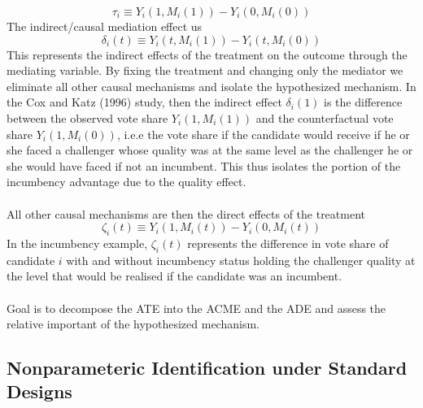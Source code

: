 \documentclass{article}
\begin{document}
	$$
	\tau_i \equiv Y_i(1, M_i(1)) - Y_i(0,M_i(0))
	$$
	The indirect/causal mediation effect us
	$$
	\delta_i(t) \equiv Y_i(t,M_i(1)) - Y_i(t, M_i(0))
	$$
	This represents the indirect effects of the treatment on the outcome through the mediating variable. By fixing the treatment and changing only the mediator we eliminate all other causal mechanisms and isolate the hypothesized mechanism. In the Cox and Katz (1996) study, then the indirect effect $\delta_i(1)$ is the difference between the observed vote share $Y_i(1,M_i(1))$ and the counterfactual vote share $Y_i(1, M_i(0))$, i.e.e the vote share if the candidate would receive if he or she faced a challenger whose quality was at the same level as the challenger he or she would have faced if not an incumbent. This thus isolates the portion of the incumbency advantage due to the quality effect. 
	\\~\\
	All other causal mechanisms are then the direct effects of the treatment 
	$$
	\zeta_i(t) \equiv Y_i(1, M_i(t)) - Y_i(0,M_i(t))
	$$
	In the incumbency example, $\zeta_i(t)$ represents the difference in vote share of candidate $i$ with and without incumbency status holding the challenger quality at the level that would be realised if the candidate was an incumbent. 
	\\~\\
	Goal is to decompose the ATE into the ACME and the ADE and assess the relative important of the hypothesized mechanism. 
	
	\subsection{Nonparameteric Identification under Standard Designs}
	
\end{document}

